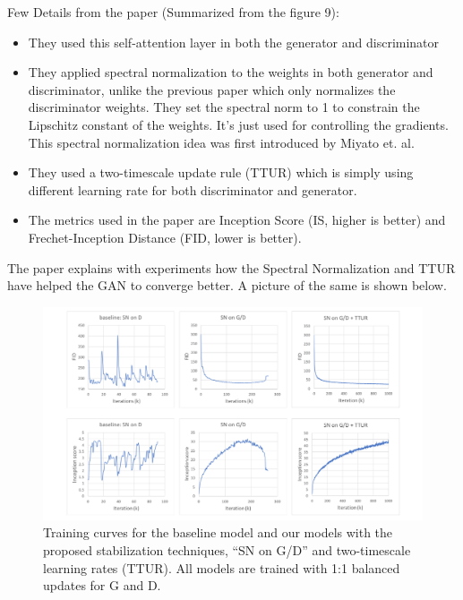 \documentclass{article}
\begin{document}
Few Details from the paper (Summarized from the figure 9):
\begin{itemize}
    \item They used this self-attention layer in both the generator and discriminator
    \item They applied spectral normalization to the weights in both generator and discriminator, unlike the previous paper which only normalizes the discriminator weights. They set the spectral norm to 1 to constrain the Lipschitz constant of the weights. It’s just used for controlling the gradients. This spectral normalization idea was first introduced by Miyato et. al.
    \item They used a two-timescale update rule (TTUR) which is simply using different learning rate for both discriminator and generator.
    \item The metrics used in the paper are Inception Score (IS, higher is better) and Frechet-Inception Distance (FID, lower is better).
\end{itemize}

The paper explains with experiments how the Spectral Normalization and TTUR have helped the GAN to converge better. A picture of the same is shown below.
\medskip


\begin{figure}[h]
    \centering
    \includegraphics[width=1\textwidth]{images/stablize_summary.png}
    \caption{Training curves for the baseline model and our models with the proposed stabilization techniques, “SN on G/D” and two-timescale learning rates (TTUR). All models are trained with 1:1 balanced updates for G and D.}
    \label{fig:mesh1}
\end{figure}
\end{document}
